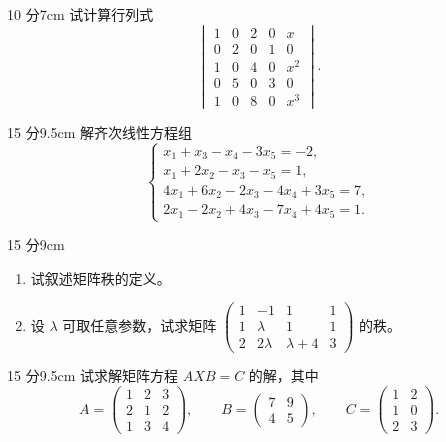 
\begin{problem}{10 分}{7cm}
试计算行列式
\[
\begin{vmatrix}
1&0&2&0&x\\
0&2&0&1&0\\
1&0&4&0&x^{2}\\
0&5&0&3&0\\
1&0&8&0&x^{3}
\end{vmatrix}.
\]
\end{problem}

\begin{problem}{15 分}{9.5cm}
解齐次线性方程组
\[
\begin{cases}
x_1+x_3-x_4-3x_5=-2,\\
x_1+2x_2-x_3-x_5=1,\\
4x_1+6x_2-2x_3-4x_4+3x_5=7,\\
2x_1-2x_2+4x_3-7x_4+4x_5=1.
\end{cases}
\]
\end{problem}

\begin{problem}{15 分}{9cm}
\begin{enumerate}[label=(\arabic*),leftmargin=2.2em,itemsep=0.3em,topsep=0.3em]
  \item 试叙述矩阵秩的定义。
  \item 设 $\lambda$ 可取任意参数，试求矩阵
  $\begin{pmatrix}1&-1&1&1\\1&\lambda&1&1\\2&2\lambda&\lambda+4&3\end{pmatrix}$
  的秩。
\end{enumerate}
\end{problem}

\begin{problem}{15 分}{9.5cm}
试求解矩阵方程 $AXB=C$ 的解，其中
\[
A=\begin{pmatrix}1&2&3\\2&1&2\\1&3&4\end{pmatrix},\qquad
B=\begin{pmatrix}7&9\\4&5\end{pmatrix},\qquad
C=\begin{pmatrix}1&2\\1&0\\2&3\end{pmatrix}.
\]
\end{problem}


